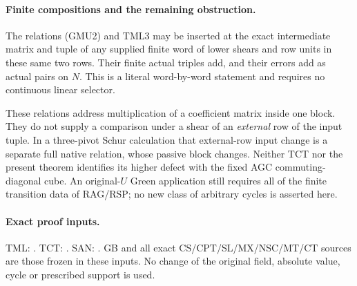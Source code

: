 \paragraph{Finite compositions and the remaining obstruction.}
The relations (GMU2) and TML3 may be inserted at the exact
intermediate matrix and tuple of any supplied finite word of
lower shears and row units in these same two rows.  Their finite
actual triples add, and their errors add as actual pairs on $N$.
This is a literal word-by-word statement and requires no
continuous linear selector.

These relations address multiplication of a coefficient matrix
inside one block.  They do not supply a comparison under a shear
of an \emph{external} row of the input tuple.  In a three-pivot
Schur calculation that external-row input change is a separate
full native relation, whose passive block changes.  Neither
TCT nor the present theorem identifies its higher defect with
the fixed AGC commuting-diagonal cube.  An original-$U$ Green
application still requires all of the finite transition data
of RAG/RSP; no new class of arbitrary cycles is asserted here.

\paragraph{Exact proof inputs.}
TML: .
TCT: .
SAN: .
GB and all exact CS/CPT/SL/MX/NSC/MT/CT sources are those frozen
in these inputs.  No change of the original field, absolute value,
cycle or prescribed support is used.
